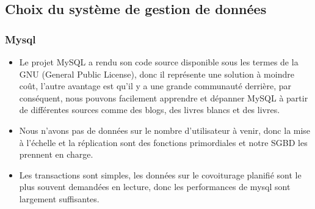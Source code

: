 \subsection{Choix du système de gestion de données} %
\label{sub:partie_base_de_données}
\subsubsection{Mysql} %
\label{ssub:le_choix_de_mysql}
\begin{itemize}
	\item Le projet MySQL a rendu son code source disponible sous les termes de la GNU (General Public License), donc il représente une solution à moindre coût, l'autre avantage est qu'il y a une grande communauté derrière, par conséquent, nous pouvons facilement apprendre et dépanner MySQL à partir de différentes sources comme des blogs, des livres blancs et des livres.
	\item Nous n'avons pas de données sur le nombre d'utilisateur à venir, donc la mise à l'échelle et la réplication sont des fonctions primordiales et notre SGBD les prennent  en charge.
	\item Les transactions sont simples, les données sur le covoiturage planifié sont le plus souvent demandées en lecture, donc les performances de mysql sont largement suffisantes.
\end{itemize}

